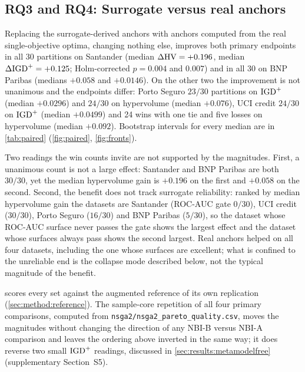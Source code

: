 \subsection{RQ3 and RQ4: Surrogate versus real anchors}
\label{sec:results:anchors}



Replacing the surrogate-derived anchors with anchors computed from the real single-objective optima, changing nothing
else, improves both primary endpoints in all 30 partitions on Santander (median $\Delta\mathrm{HV} = +0.196$, median
$\Delta\mathrm{IGD}^{+} = +0.125$; Holm-corrected $p = 0.004$ and $0.007$) and in all 30 on BNP Paribas (medians $+0.058$ and
$+0.0146$). On the other two the improvement is not unanimous and the endpoints differ: Porto Seguro $23/30$
partitions on $\mathrm{IGD}^{+}$ (median $+0.0296$) and $24/30$ on hypervolume (median $+0.076$), UCI credit $24/30$ on $\mathrm{IGD}^{+}$
(median $+0.0499$) and 24 wins with one tie and five losses on hypervolume (median $+0.092$). Bootstrap intervals for
every median are in \cref{tab:paired} (\cref{fig:paired}, \cref{fig:fronts}).

Two readings the win counts invite are not supported by the magnitudes. First, a unanimous count is not a large
effect: Santander and BNP Paribas are both $30/30$, yet the median hypervolume gain is $+0.196$ on the first and
$+0.058$ on the second. Second, the benefit does not track surrogate reliability: ranked by median hypervolume gain
the datasets are Santander (ROC-AUC gate $0/30$), UCI credit ($30/30$), Porto Seguro ($16/30$) and BNP Paribas
($5/30$), so the dataset whose ROC-AUC surface never passes the gate shows the largest effect and the dataset whose
surfaces always pass shows the second largest. Real anchors helped on all four datasets, including the one whose
surfaces are excellent; what is confined to the unreliable end is the collapse mode described below, not the typical
magnitude of the benefit.

 scores every set against the augmented reference of its own replication
(\cref{sec:method:reference}). The sample-core repetition of all four primary comparisons, computed from
\texttt{nsga2/\allowbreak nsga2\_\allowbreak pareto\_\allowbreak quality.csv}, moves the magnitudes without changing
the direction of any NBI-B versus NBI-A comparison and leaves the ordering above inverted in the same way; it does
reverse two small $\mathrm{IGD}^{+}$ readings, discussed in \cref{sec:results:metamodelfree} (supplementary Section~S5).

